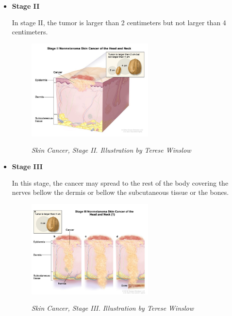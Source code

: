 \begin{itemize}
  \item \textbf{Stage II}

    In stage II, the tumor is larger than 2 centimeters but not larger than 4
    centimeters.

    \begin{figure}[H] \centering
      \includegraphics[width=0.6\textwidth]{imatges/problem_domain/stage2-skin-cancer.jpg}
      \caption[Skin Cancer, Stage II]{\textit{Skin Cancer, Stage II.
      Illustration by Terese Winslow}} {\label{fig:stage2-skin-canceer}}
    \end{figure}

    \newpage

  \item \textbf{Stage III}

    In this stage, the cancer may spread to the rest of the body covering the
    nerves bellow the dermis or bellow the subcutaneous tissue or the bones.

    \begin{figure}[H] \centering
      \includegraphics[width=0.6\textwidth]{imatges/problem_domain/stage3-skin-cancer.jpg}
      \caption[Skin Cancer, Stage III]{\textit{Skin Cancer, Stage III. Illustration by
    Terese Winslow}} {\label{fig:stage3-skin-canceer}} \end{figure}

\end{itemize}

